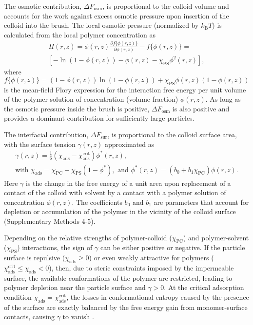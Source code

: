 \documentclass[12pt, a4paper]{article}
\begin{document}
The osmotic contribution, $\Delta F_{\text{osm}}$, is proportional to the colloid volume and accounts for the work against excess osmotic pressure upon insertion of the colloid into the brush.
The local osmotic pressure (normalized by $k_\text{B} T$) is calculated from the local polymer concentration as
\begin{equation}
    \begin{aligned}
        \Pi(r,z)=  \phi(r,z)\frac{\partial f\{\phi(r,z)\}}{\partial \phi(r,z)} - f\{\phi(r,z)\}= 
        \\
        [-\ln(1-\phi(r,z)) - \phi(r,z) -\chi_{\text{PS}}\phi^2(r,z)],
    \end{aligned}
    \label{eq:osmotic}
\end{equation}
where 
$$
f\{\phi(r,z)\}=(1-\phi(r,z))\ln(1-\phi(r,z)) +\chi_{\text{PS}}\phi(r,z)(1-\phi(r,z))
$$
is the mean-field Flory expression for the interaction free energy per unit volume of the polymer solution of concentration (volume fraction) $\phi(r,z)$.
As long as the osmotic pressure inside the brush is positive, $\Delta F_{\text{osm}}$ is also positive and provides a dominant contribution for sufficiently large particles.

The interfacial contribution, $\Delta F_{\text{sur}}$, is proportional to the colloid surface area, with the surface tension $\gamma (r,z)$ approximated as
\begin{gather}
     \gamma (r,z)= \frac{1}{6}(\chi_{\text{ads}} - \chi_{\text{ads}}^{\text{crit}})\phi^{\ast}(r,z),
    \label{eq:chi_ads} 
    \\
    \text{with } \chi_{\text{ads}} = \chi_{\text{PC}} - \chi_{\text{PS}}(1-\phi^{\ast}), \text{ and } \phi^{\ast}(r,z)= (b_{0} + b_{1}\chi_{\text{PC}})\phi(r,z).
    \nonumber
\end{gather}
Here $\gamma$ is the change in the free energy of a unit area upon replacement of a contact of the colloid with solvent by a contact with a polymer solution of concentration $\phi(r,z)$.
The coefficients $b_0$ and $b_1$ are parameters that account for depletion or accumulation of the polymer in the vicinity of the colloid surface (Supplementary Methods 4-5).

Depending on the relative strengths of polymer-colloid ($\chi_{\text{PC}}$) and polymer-solvent ($\chi_{\text{PS}}$) interactions, the sign of $\gamma$ can be either positive or negative.
If the particle surface is repulsive ($\chi_{\text{ads}} \geq 0$) or even weakly attractive for polymers ($\chi_{\text{ads}}^{\text{crit}} \leq \chi_{\text{ads}} < 0$), then, due to steric constraints imposed by the impermeable surface, the available conformations of the polymer are restricted, leading to polymer depletion near the particle surface and $\gamma > 0$.
At the critical adsorption condition $\chi_{\text{ads}} = \chi_{\text{ads}}^{\text{crit}}$, the losses in conformational entropy caused by the presence of the surface are exactly balanced by the free energy gain from monomer-surface contacts, causing $\gamma$ to vanish \cite{Fleer1993,Birshtein1979,Birshtein1983,Eisenriegler1982}.
\end{document}
